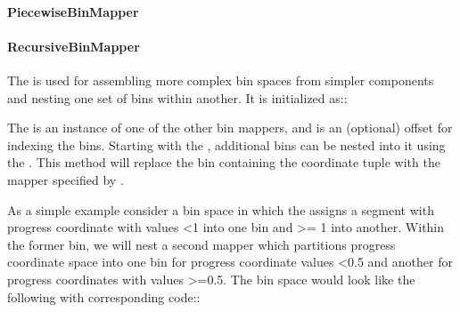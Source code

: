 \documentclass[letterpaper,10pt,english]{sphinxmanual}
\begin{document}
\paragraph{PiecewiseBinMapper}
\label{\detokenize{users_guide/west/setup:piecewisebinmapper}}

\paragraph{RecursiveBinMapper}
\label{\detokenize{users_guide/west/setup:recursivebinmapper}}
The  is used for assembling more complex bin spaces from
simpler components and nesting one set of bins within another. It is
initialized as::

\begin{sphinxVerbatim}[commandchars=\\\{\}]
   
\end{sphinxVerbatim}

The  is an instance of one of the other bin mappers, and
 is an (optional) offset for indexing the bins. Starting with
the , additional bins can be nested into it using the
. This method will replace the bin
containing the coordinate tuple  with the mapper specified
by .

As a simple example consider a bin space in which the  assigns a
segment with progress coordinate with values \textless{}1 into one bin and \textgreater{}= 1 into
another. Within the former bin, we will nest a second mapper which partitions
progress coordinate space into one bin for progress coordinate values \textless{}0.5 and
another for progress coordinates with values \textgreater{}=0.5. The bin space would look
like the following with corresponding code::
\end{document}
